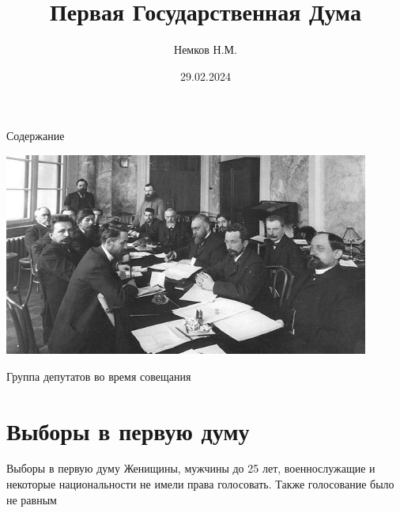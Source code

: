 

\title{Первая Государственная Дума}
\author{Немков Н.М.}
\date{29.02.2024}



\begin{frame}
\maketitle
\end{frame}

\begin{frame}{Содержание}
\tableofcontents
\end{frame}


\begin{frame}

	\includegraphics[width=0.9\textwidth]{images/duma-1.png}

	Группа депутатов во время совещания
\end{frame}

\section{Выборы в первую думу}

\begin{frame}{Выборы в первую думу}
	\Large{Женищины, мужчины до 25 лет, военнослужащие и некоторые национальности не имели права голосовать. Также голосование было не равным
	}
\end{frame}

